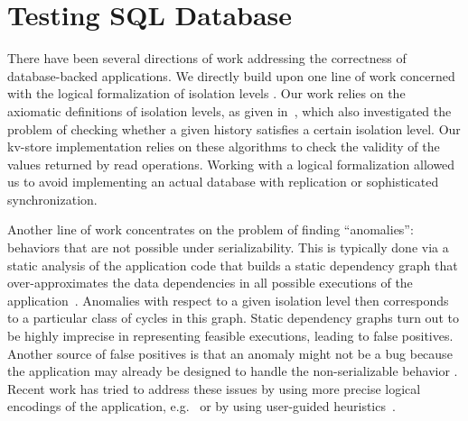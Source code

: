 
\section{Testing SQL Database}
\label{sec:app:related}


There have been several directions of work addressing the correctness of database-backed applications. 
We directly build upon one line of work concerned with the logical formalization
of isolation levels 
\cite{ansi,DBLP:conf/icde/AdyaLO00,DBLP:conf/sigmod/BerensonBGMOO95,DBLP:conf/concur/Cerone0G15,DBLP:journals/pacmpl/BiswasE19}.
Our work relies on the axiomatic definitions of isolation levels, as given
in~\cite{DBLP:journals/pacmpl/BiswasE19}, which also investigated
the problem of checking whether a given history satisfies a certain isolation
level. Our kv-store implementation relies on these algorithms 
to check the validity of the values returned by read operations. Working with a
logical formalization allowed us to avoid implementing an actual database with replication or
sophisticated synchronization.

Another line of work concentrates on the problem of finding ``anomalies'': 
behaviors that are not possible under serializability. This is typically done
via a static analysis of the application code that builds a static dependency graph that
over-approximates the data dependencies in all possible
executions of the application~\cite{DBLP:journals/jacm/CeroneG18,DBLP:journals/jacm/CeroneG18,DBLP:conf/concur/0002G16,DBLP:journals/tods/FeketeLOOS05,DBLP:conf/vldb/JorwekarFRS07,DBLP:conf/sigmod/WarszawskiB17,DBLP:journals/pvldb/GanRRB020}.
Anomalies with respect to a given isolation level then corresponds to a
particular class of cycles in this graph. Static dependency graphs turn out to
be highly imprecise in representing feasible executions, leading to false
positives. Another source of false positives is that an anomaly might not be a
bug because the application may already be designed to handle the
non-serializable behavior \cite{DBLP:conf/pldi/BrutschyD0V18,DBLP:journals/pvldb/GanRRB020}. 
Recent work has tried to address these issues by using more precise 
logical encodings of the application,
e.g.~\cite{DBLP:conf/popl/BrutschyD0V17,DBLP:conf/pldi/BrutschyD0V18} or
by using user-guided heuristics~\cite{DBLP:journals/pvldb/GanRRB020}. 

